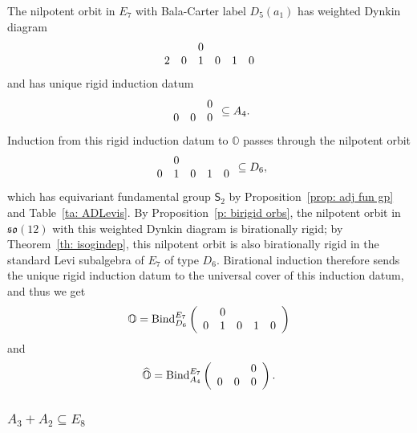 \documentclass[11pt]{amsart}
\renewcommand{\O}{{\mathbb O}}
\newcommand{\so}{{\mathfrak s}{\mathfrak o}}
\newcommand{\Sym}{{\mathsf{S}}}
\newcommand{\BInd}{{{\mbox{\rm Bind}}}}
\newcommand{\hatO}{\widehat{\O}}
\numberwithin{equation}{section}
\begin{document}
	The nilpotent orbit in $E_7$ with Bala-Carter label $D_5(a_1)$ has weighted Dynkin diagram
	$$\begin{array}{c c c c c c}
		& & 0 & & & \\
		2 & 0 & 1 & 0 & 1 & 0 \\
	\end{array}$$ and has unique rigid induction datum $$\begin{array}{c c c c c c}
		& & 0 \\
		0 & 0 & 0  \\
	\end{array}\subseteq A_4.$$ Induction from this rigid induction datum to $\O$ passes through the nilpotent orbit $$\begin{array}{c c c c c}
		& 0 & & &  \\
		0 & 1 & 0 & 1 & 0 \\
	\end{array}\subseteq D_6,$$ which has equivariant fundamental group $\Sym_2$ by Proposition~\ref{prop: adj fun gp} and Table~\ref{ta: ADLevis}. By Proposition~\ref{p: birigid orbs}, the nilpotent orbit in $\so(12)$ with this weighted Dynkin diagram is birationally rigid; by Theorem~\ref{th: isogindep}, this nilpotent orbit is also birationally rigid in the standard Levi subalgebra of $E_7$ of type $D_6$. Birational induction therefore sends the unique rigid induction datum to the universal cover of this induction datum, and thus we get $$\O=\BInd_{D_6}^{E_7}\left(\begin{array}{c c c c c}
		& 0 & & &  \\
		0 & 1 & 0 & 1 & 0 \\
	\end{array}\right)$$ and $$\hatO=\BInd_{A_4}^{E_7}\left(\begin{array}{c c c c c c}
		& & 0 \\
		0 & 0 & 0  \\
	\end{array}\right).$$
	
	\subsubsection{\texorpdfstring{$A_3+A_2\subseteq E_8$}{A3A2 in E8}}\label{sss: A3A2 in E8}
	
\end{document}
